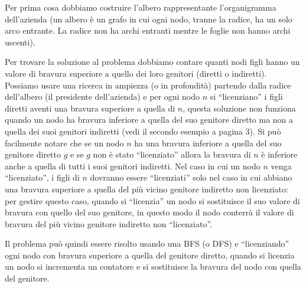 

Per prima cosa dobbiamo costruire l'albero rappresentante l'organigramma dell'azienda (un albero è un grafo in cui ogni nodo, tranne la radice, ha un solo arco entrante. La radice non ha archi entranti mentre le foglie non hanno archi uscenti). 

Per trovare la soluzione al problema dobbiamo contare quanti nodi figli hanno un valore di bravura superiore a quello dei loro genitori (diretti o indiretti). Possiamo usare una ricerca in ampiezza (o in profondità) partendo dalla radice dell'albero (il presidente dell'azienda) e per ogni nodo $n$ si ``licenziano'' i figli diretti aventi una bravura superiore a quella di $n$, questa soluzione non funziona quando un nodo ha bravura inferiore a quella del suo genitore diretto ma non a quella dei suoi genitori indiretti (vedi il secondo esempio a pagina 3). Si può facilmente notare che se un nodo $n$ ha una bravura inferiore a quella del suo genitore diretto $g$ e se $g$ non è stato ``licenziato'' allora la bravura di $n$ è inferiore anche a quella di tutti i suoi genitori indiretti. Nel caso in cui un nodo $n$ venga ``licenziato'', i figli di $n$ dovranno essere ``licenziati'' solo nel caso in cui abbiano una bravura superiore a quella del più vicino genitore indiretto non licenziato: per gestire questo caso, quando si ``licenzia'' un nodo si sostituisce il suo valore di bravura con quello del suo genitore, in questo modo il nodo conterrà il valore di bravura del più vicino genitore indiretto non ``licenziato''.

Il problema può quindi essere risolto usando una BFS (o DFS) e ``licenziando'' ogni nodo con bravura superiore a quella del genitore diretto, quando si licenzia un nodo si incrementa un contatore e si sostituisce la bravura del nodo con quella del genitore.
\Codice
\colorbox{white}{} 